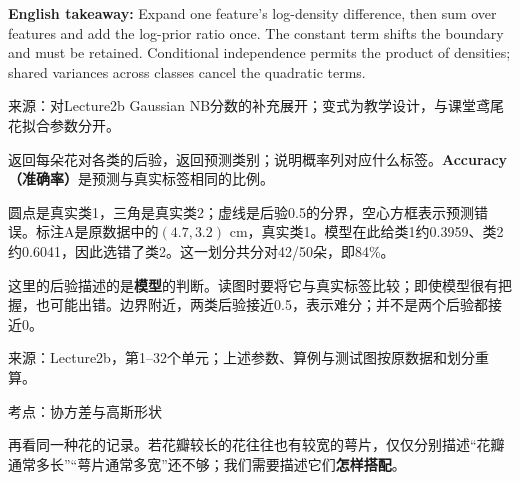 \textbf{English takeaway:} Expand one feature’s log-density difference, then sum over features and add the log-prior ratio once. The constant term shifts the boundary and must be retained. Conditional independence permits the product of densities; shared variances across classes cancel the quadratic terms.


来源：对Lecture2b Gaussian NB分数的补充展开；变式为教学设计，与课堂鸢尾花拟合参数分开。








返回每朵花对各类的后验，返回预测类别；说明概率列对应什么标签。\textbf{Accuracy（准确率）}是预测与真实标签相同的比例。




圆点是真实类1，三角是真实类2；虚线是后验0.5的分界，空心方框表示预测错误。标注A是原数据中的\((4.7,3.2)\) cm，真实类1。模型在此给类1约0.3959、类2约0.6041，因此选错了类2。这一划分共分对42/50朵，即84\%。


这里的后验描述的是\textbf{模型}的判断。读图时要将它与真实标签比较；即使模型很有把握，也可能出错。边界附近，两类后验接近0.5，表示难分；并不是两个后验都接近0。


来源：Lecture2b，第1–32个单元；上述参数、算例与测试图按原数据和划分重算。








考点：协方差与高斯形状
 

再看同一种花的记录。若花瓣较长的花往往也有较宽的萼片，仅仅分别描述“花瓣通常多长”“萼片通常多宽”还不够；我们需要描述它们\textbf{怎样搭配}。


